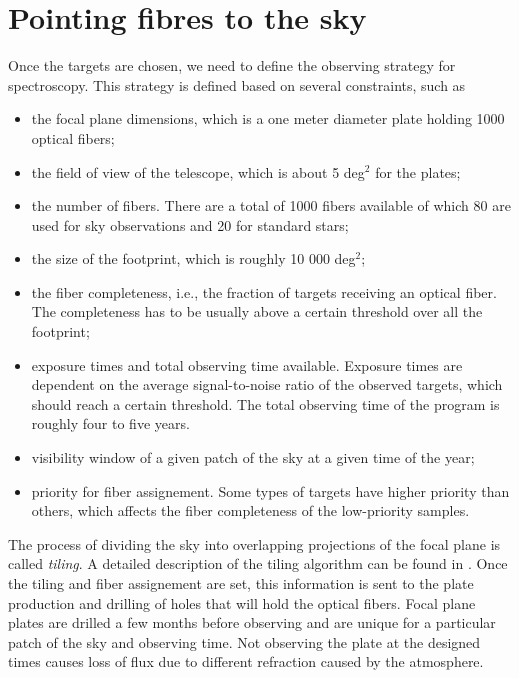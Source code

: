 \section{Pointing fibres to the sky}
\label{spectro:fibers}

Once the targets are chosen, we need to define the observing strategy
for spectroscopy. This strategy is defined based on several constraints, 
such as 
\begin{itemize}
    \item the focal plane dimensions, which is a one meter diameter plate holding 1000 optical fibers;
    \item the field of view of the telescope, which is about 5 deg$^2$ for the plates; 
    \item the number of fibers. There are a total of 1000 fibers available of 
            which 80 are used for sky observations and 20 for standard stars; 
    \item the size of the footprint, which is roughly 10 000 deg$^2$; 
    \item the fiber completeness, i.e., the fraction of targets receiving an 
          optical fiber. The completeness has to be usually above a certain 
          threshold over all the footprint;
    \item exposure times and total observing time available. 
        Exposure times are dependent on the average signal-to-noise ratio of 
        the observed targets, which should reach a certain threshold. 
        The total observing time of the program is roughly four to five years. 
    \item visibility window of a given patch of the sky at a given time of the year; 
    \item priority for fiber assignement. Some types of targets have higher priority than others,
        which affects the fiber completeness of the low-priority samples.  
\end{itemize}

The process of dividing the sky into overlapping projections of the focal plane 
is called \emph{tiling}. A detailed description of the tiling algorithm can be found in 
\cite{blantonEfficientTargetingStrategy2003}. 
Once  the tiling and fiber assignement
are set, this information is sent to the plate production and drilling of holes 
that will hold the optical fibers. Focal plane plates are drilled a few months 
before observing and are unique for a particular patch of the sky and observing time. 
Not observing the plate at the designed times causes loss of flux due to different 
refraction caused by the atmosphere. 

